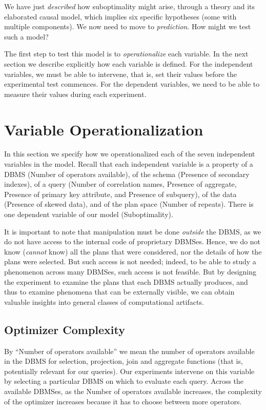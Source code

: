 \documentclass[prodmode,acmtods]{acmsmall}
\begin{document}
\vspace{0.6em}
We have just {\em described} how
suboptimality might arise, through a theory and its elaborated causal model,
which implies six specific hypotheses (some with multiple components).
We now need to move to {\em prediction}.
How might we test such a model? 

The first step to test this model is to {\em operationalize} each
variable. In the next section we describe explicitly how each variable is
defined. For the independent variables, we must be able to intervene, that is,
set their values before the experimental test commences. For the
dependent variables, we need to be able to measure their values during each experiment.

\section{Variable Operationalization}\label{sec:operationalization}

In this section we specify how we operationalized each of the seven independent
variables in the model.  Recall that each independent variable is a property
of a \hbox{DBMS} (Number of operators available), of the schema (Presence
  of secondary indexes), of a query (Number of correlation names,
Presence of aggregate, Presence of primary key attribute, and
Presence of subquery), of the data (Presence of skewed data), and of
the plan space (Number of repeats). There is 
one dependent variable of our model (Suboptimality).

It is important to note that manipulation must be done {\em
  outside} the \hbox{DBMS}, as we do not have access to the
internal code of proprietary DBMSes. Hence, we do not know ({\em cannot} know) all the plans that were
considered, nor the details of how the plans were selected. But such access
is not needed; indeed, to be able to study a phenomenon across many \hbox{DBMSes},
such access is not feasible. But by designing the experiment to examine
the plans that each \hbox{DBMS} actually produces, and thus to examine phenomena
that can be externally visible, we can obtain valuable insights into general
classes of computational artifacts. 

\subsection{Optimizer Complexity}
By ``Number of operators available'' we mean the \hbox{number} of operators
available in the \hbox{DBMS} for selection, projection, join and aggregate
functions (that is, potentially relevant for our queries). Our
experiments intervene on this variable by selecting a particular \hbox{DBMS} on
which to evaluate each query. Across the available \hbox{DBMSes}, as the Number of
operators available increases, the complexity of the optimizer increases
because it has to choose between more operators.
\end{document}
